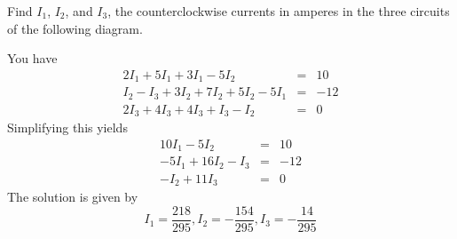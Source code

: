 \begin{ex} Find $I_1$, $I_2$, and $I_3$, the counterclockwise currents in
  amperes in the three circuits of the following diagram.

  \begin{center}
  \end{center}

  \begin{sol}
    You
    have
    \begin{eqnarray*}
      2I_1 + 5I_1 + 3I_1 - 5I_2 &=& 10 \\
      I_2 - I_3 + 3I_2 + 7I_2 + 5I_2 - 5I_1 &=& -12 \\
      2I_3 + 4I_3 + 4I_3 + I_3 - I_2 &=& 0
    \end{eqnarray*}
    Simplifying this yields
    \begin{eqnarray*}
      10I_1 - 5I_2 &=& 10 \\
      -5I_1 + 16I_2 - I_3 &=& -12 \\
      -I_2 + 11I_3 &=& 0
    \end{eqnarray*}
    The solution is given by
    \begin{equation*}
      I_1 = \frac{218}{295},
      I_2 = -\frac{154}{295},
      I_3 = -\frac{14}{295}
    \end{equation*}

  \end{sol}
\end{ex}

